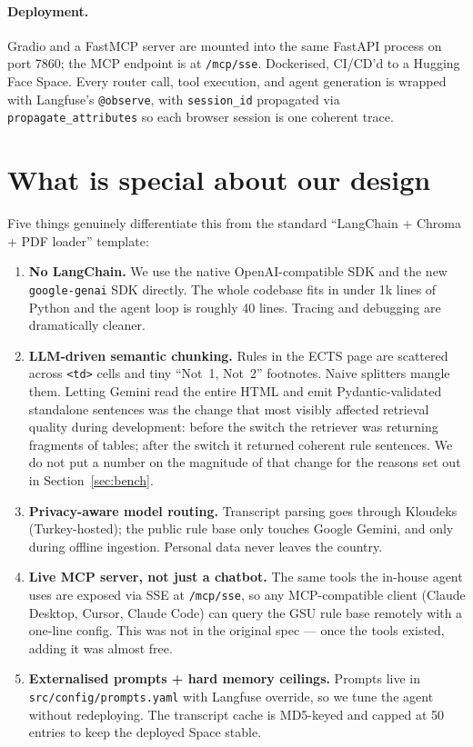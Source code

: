 \documentclass[11pt,a4paper]{article}
\begin{document}
\paragraph{Deployment.} Gradio and a FastMCP server are mounted into the same
FastAPI process on port 7860; the MCP endpoint is at \texttt{/mcp/sse}.
Dockerised, CI/CD'd to a Hugging Face Space. Every router call, tool execution,
and agent generation is wrapped with Langfuse's \texttt{@observe}, with
\texttt{session\_id} propagated via \texttt{propagate\_attributes} so each
browser session is one coherent trace.

\section{What is special about our design}

Five things genuinely differentiate this from the standard
``LangChain + Chroma + PDF loader'' template:

\begin{enumerate}[leftmargin=*, itemsep=0.2em]
    \item \textbf{No LangChain.} We use the native OpenAI-compatible SDK and the
          new \texttt{google-genai} SDK directly. The whole codebase fits in
          under 1k lines of Python and the agent loop is roughly 40 lines.
          Tracing and debugging are dramatically cleaner.
    \item \textbf{LLM-driven semantic chunking.} Rules in the ECTS page are
          scattered across \texttt{<td>} cells and tiny ``Not~1, Not~2''
          footnotes. Naive splitters mangle them. Letting Gemini read the entire
          HTML and emit Pydantic-validated standalone sentences was the change
          that most visibly affected retrieval quality during development:
          before the switch the retriever was returning fragments of tables;
          after the switch it returned coherent rule sentences. We do not put
          a number on the magnitude of that change for the reasons set out in
          Section~\ref{sec:bench}.
    \item \textbf{Privacy-aware model routing.} Transcript parsing goes through
          Kloudeks (Turkey-hosted); the public rule base only touches Google
          Gemini, and only during offline ingestion. Personal data never leaves
          the country.
    \item \textbf{Live MCP server, not just a chatbot.} The same tools the
          in-house agent uses are exposed via SSE at \texttt{/mcp/sse}, so any
          MCP-compatible client (Claude Desktop, Cursor, Claude Code) can query
          the GSU rule base remotely with a one-line config. This was not in the
          original spec --- once the tools existed, adding it was almost free.
    \item \textbf{Externalised prompts + hard memory ceilings.} Prompts live in
          \texttt{src/config/prompts.yaml} with Langfuse override, so we tune
          the agent without redeploying. The transcript cache is MD5-keyed and
          capped at 50 entries to keep the deployed Space stable.
\end{enumerate}
\end{document}
